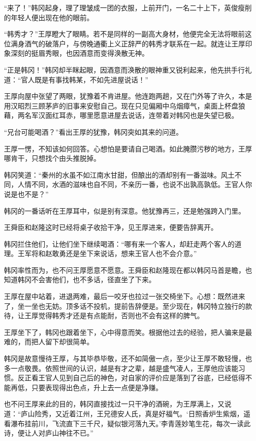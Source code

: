 “来了！”韩冈起身，理了理皱成一团的衣服，上前开门，一名二十上下，英俊瘦削的年轻人便出现在他的眼前。

“韩秀才？”王厚瞪大了眼睛。若不是同样的一副高大身材，他便完全无法将眼前这位满身酒气的破落户，与傍晚通衢上义正辞严的韩秀才联系在一起。就连让王厚印象深刻的挺眉秀眼，也因酒意而变得涣散无神。

“正是韩冈！”韩冈却半眯起眼，因酒意而涣散的眼神重又锐利起来，他先拱手行礼道：“官人既是有事找韩某，不如先进屋说话！”

王厚向屋中张望了两眼，犹豫着不肯进屋。他连跑两趟，又在门外等了许久，本是用汉昭烈三顾茅庐的旧事来安慰自己。现在只见偏厢中乌烟瘴气，桌面上杯盘狼藉，两名军汉面红耳赤，哪里愿意进屋去说话，连带着对韩冈也是失望已极。

“兄台可能喝酒？”看出王厚的犹豫，韩冈突如其来的问道。

王厚一愣，不知该如何回答。心想怕是要请自己喝酒。如此腌臜污秽的地方，王厚哪肯干，只想找个由头推脱掉。

韩冈笑道：“秦州的水虽不如江南水甘甜，但酿出的酒却别有一番滋味。风土不同，人情不同，水酒的滋味也自不同，不亲历一番，也说不出孰高孰低。王官人你说是也不是？”

韩冈的一番话听在王厚耳中，似是别有深意。他犹豫再三，还是勉强跨入门里。

王舜臣和赵隆这时已经将桌子收拾干净，见王厚进来，便要告辞离开。

韩冈拦住他们，让他们坐下继续喝酒：“哪有来一个客人，却赶走两个客人的道理。王军将和赵敢勇还是坐下来说话，想来王官人也不会介意。”

韩冈率性而为，也不问王厚愿意不愿意。王舜臣和赵隆现在都以韩冈马首是瞻，也知道韩冈不会害他们，也不多话，径直坐了下来。

王厚在屋中站着，进退两难，最后一咬牙也拉过一张交椅坐下。心想：既然进来了，坐一坐也无妨。顶多话不投机，提前告辞便是。至少现在，韩冈特立独行的款待，让王厚觉得韩秀才还是有点能耐，否则也不会有这样的脾气。

王厚坐下了，韩冈也跟着坐下，心中得意而笑。根据他过去的经验，把人骗来是最难的，而把人留下却很简单。

韩冈是故意慢待王厚，与其毕恭毕敬，还不如简傲一点，至少让王厚不敢轻慢，也多一点敬畏。依照世间的认识，越是有才之辈，越是盛气凌人，王厚他应该能习惯。反正看王官人见到自己后的神色，对自家的评价应是落到了谷底，已经低得不能再低，只要表现得出色点，升上去一点便是净赚。

也不问王厚来此的目的，韩冈直接找过一只干净的酒碗，为王厚满上，又说道：“庐山险秀，又近着江州，王兄德安人氏，真是好福气。‘日照香炉生紫烟，遥看瀑布挂前川，飞流直下三千尺，疑似银河落九天。’李青莲妙笔生花，每次一读此诗，便让人对庐山神往不已。”

